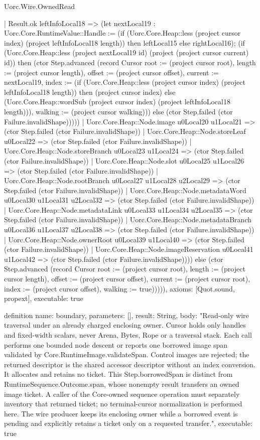\begin{lexlean}{Uorc.Wire.OwnedRead}
\begin{semanticmodule}
{        | Result.ok leftInfoLocal18 => (let nextLocal19 : Uorc.Core.RuntimeValue::Handle := (if (Uorc.Core.Heap::less (project cursor index) (project leftInfoLocal18 length)) then leftLocal15 else rightLocal16); (if (Uorc.Core.Heap::less (project nextLocal19 id) (project (project cursor current) id)) then (ctor Step.advanced (record Cursor {root := (project cursor root), length := (project cursor length), offset := (project cursor offset), current := nextLocal19, index := (if (Uorc.Core.Heap::less (project cursor index) (project leftInfoLocal18 length)) then (project cursor index) else (Uorc.Core.Heap::wordSub (project cursor index) (project leftInfoLocal18 length))), walking := (project cursor walking)})) else (ctor Step.failed (ctor Failure.invalidShape)))))
      | Uorc.Core.Heap::Node.image u0Local20 u1Local21 => (ctor Step.failed (ctor Failure.invalidShape))
      | Uorc.Core.Heap::Node.storeLeaf u0Local22 => (ctor Step.failed (ctor Failure.invalidShape))
      | Uorc.Core.Heap::Node.storeBranch u0Local23 u1Local24 => (ctor Step.failed (ctor Failure.invalidShape))
      | Uorc.Core.Heap::Node.slot u0Local25 u1Local26 => (ctor Step.failed (ctor Failure.invalidShape))
      | Uorc.Core.Heap::Node.rootBranch u0Local27 u1Local28 u2Local29 => (ctor Step.failed (ctor Failure.invalidShape))
      | Uorc.Core.Heap::Node.metadataWord u0Local30 u1Local31 u2Local32 => (ctor Step.failed (ctor Failure.invalidShape))
      | Uorc.Core.Heap::Node.metadataLink u0Local33 u1Local34 u2Local35 => (ctor Step.failed (ctor Failure.invalidShape))
      | Uorc.Core.Heap::Node.metadataBranch u0Local36 u1Local37 u2Local38 => (ctor Step.failed (ctor Failure.invalidShape))
      | Uorc.Core.Heap::Node.ownerRoot u0Local39 u1Local40 => (ctor Step.failed (ctor Failure.invalidShape))
      | Uorc.Core.Heap::Node.imageReservation u0Local41 u1Local42 => (ctor Step.failed (ctor Failure.invalidShape)))) else (ctor Step.advanced (record Cursor {root := (project cursor root), length := (project cursor length), offset := (project cursor offset), current := (project cursor root), index := (project cursor offset), walking := true}))))),
  axioms: [Quot.sound, propext],
  executable: true
}

definition{
  name: boundary,
  parameters: [],
  result: String,
  body: "Read-only wire traversal under an already charged enclosing owner. Cursor holds only handles and fixed-width scalars, never Arena, Bytes, Rope or a traversal stack. Each call performs one bounded node descent or reports one borrowed image span validated by Core.RuntimeImage.validateSpan. Control images are rejected; the returned descriptor is the shared accessor descriptor without an index conversion. It allocates and retains no ticket. This Step.borrowedSpan is distinct from RuntimeSequence.Outcome.span, whose nonempty result transfers an owned image ticket. A caller of the Core-owned sequence operation must separately inventory that returned ticket; no terminal-cursor normalization is performed here. The wire producer keeps its enclosing owner while a borrowed event is pending and explicitly retains a ticket only on a requested transfer.",
  executable: true
}
\end{semanticmodule}
\end{lexlean}
